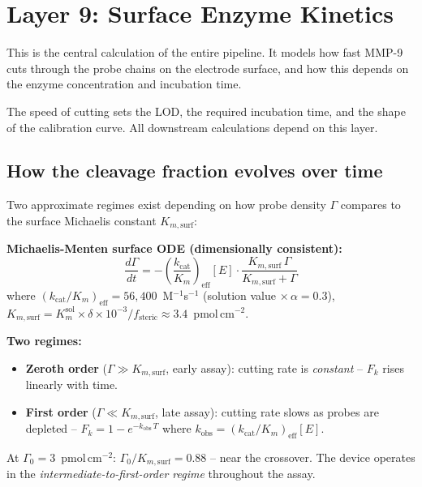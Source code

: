 \documentclass[10pt,a4paper]{article}
\newenvironment{eqbox}{%
  \begin{lrbox}{\tmpbox}\begin{minipage}{0.965\textwidth}\vspace{0.2em}}%
 {\vspace{0.2em}\end{minipage}\end{lrbox}%
  \par\vspace{0.3em}\noindent\colorbox{boxgray}{\usebox{\tmpbox}}\par\vspace{0.3em}}
\begin{document}
\section{Layer 9: Surface Enzyme Kinetics}


This is the central calculation of the entire pipeline. It models how fast MMP-9 cuts through
the probe chains on the electrode surface, and how this depends on the enzyme concentration
and incubation time.


The speed of cutting sets the LOD, the required incubation time, and the shape of the
calibration curve. All downstream calculations depend on this layer.

\subsection{How the cleavage fraction evolves over time}

Two approximate regimes exist depending on how probe density $\Gamma$ compares to the surface
Michaelis constant $K_{m,\text{surf}}$:

\begin{eqbox}
\textbf{Michaelis-Menten surface ODE (dimensionally consistent):}
\begin{equation}
\frac{d\Gamma}{dt} = -\left(\frac{k_\text{cat}}{K_m}\right)_\text{eff}
  [E] \cdot \frac{K_{m,\text{surf}}\,\Gamma}{K_{m,\text{surf}} + \Gamma}
\end{equation}
where $(k_\text{cat}/K_m)_\text{eff} = 56{,}400$~M$^{-1}$s$^{-1}$ (solution value $\times\,\alpha = 0.3$),
$K_{m,\text{surf}} = K_m^\text{sol} \times \delta \times 10^{-3} / f_\text{steric}
  \approx 3.4$~pmol\,cm$^{-2}$.

\textbf{Two regimes:}
\begin{itemize}[noitemsep, topsep=2pt]
\item \textbf{Zeroth order} ($\Gamma \gg K_{m,\text{surf}}$, early assay): cutting rate is
  \textit{constant} -- $F_k$ rises linearly with time.
\item \textbf{First order} ($\Gamma \ll K_{m,\text{surf}}$, late assay): cutting rate slows
  as probes are depleted -- $F_k = 1 - e^{-k_\text{obs}\,T}$ where $k_\text{obs} = (k_\text{cat}/K_m)_\text{eff}[E]$.
\end{itemize}

At $\Gamma_0 = 3$~pmol\,cm$^{-2}$: $\Gamma_0/K_{m,\text{surf}} = 0.88$ -- near the crossover.
The device operates in the \textit{intermediate-to-first-order regime} throughout the assay.
\end{eqbox}
\end{document}
